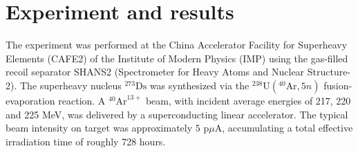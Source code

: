 \documentclass[final,5p,times,twocolumn,number,sort&compress]{elsarticle}
\begin{document}


\section{Experiment and results}
The experiment was performed at the China Accelerator Facility for Superheavy Elements (CAFE2) of the Institute of Modern Physics (IMP) using the gas-filled recoil separator SHANS2 (Spectrometer for Heavy Atoms and Nuclear Structure-2). 
The superheavy nucleus $^{273}\text{Ds}$ was synthesized via the $^{238}\text{U}(^{40}\text{Ar}, 5n)$ fusion-evaporation reaction. 
A $^{40}\text{Ar}^{13+}$ beam, with incident average energies of 217, 220 and 225 MeV, was delivered by a superconducting linear accelerator. 
The typical beam intensity on target was approximately $5\text{ p}\mu\text{A}$, accumulating a total effective irradiation time of roughly 728 hours.
\end{document}
